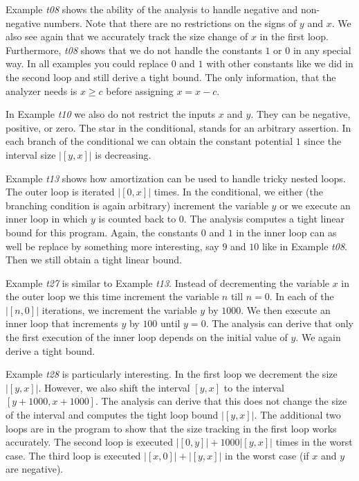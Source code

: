 \documentclass{sigplanconf}
\begin{document}
{Example \emph{t08} shows the ability of the analysis to handle
negative and non-negative numbers.  Note that there are no
restrictions on the signs of $y$ and $x$.  We also see again that we
accurately track the size change of $x$ in the first loop.
Furthermore, \emph{t08} shows that we do not handle the constants $1$
or $0$ in any special way.  In all examples you could replace $0$ and
$1$ with other constants like we did in the second loop and still
derive a tight bound.  The only information, that the analyzer needs
is $x \geq c$ before assigning $x = x - c$.

In Example \emph{t10} we also do not restrict the inputs $x$ and $y$.
They can be negative, positive, or zero.  The star {\tt *} in the
conditional, stands for an arbitrary assertion.  In each branch of the
conditional we can obtain the constant potential $1$ since the interval
size $|[y,x]|$ is decreasing.

Example \emph{t13} shows how amortization can be used to handle tricky
nested loops.  The outer loop is iterated $|[0,x]|$ times.  In the
conditional, we either (the branching condition is again arbitrary)
increment the variable $y$ or we execute an inner loop in which $y$ is
counted back to $0$.  The analysis computes a tight linear bound for
this program.  Again, the constants $0$ and $1$ in the inner loop can
as well be replace by something more interesting, say $9$ and $10$
like in Example \emph{t08}.  Then we still obtain a tight linear
bound.

Example \emph{t27} is similar to Example \emph{t13}.  Instead of
decrementing the variable $x$ in the outer loop we this time increment
the variable $n$ till $n = 0$.  In each of the $|[n,0]|$ iterations,
we increment the variable $y$ by $1000$.  We then execute an inner
loop that increments $y$ by $100$ until $y=0$.  The analysis can
derive that only the first execution of the inner loop depends on the
initial value of $y$.  We again derive a tight bound.

Example \emph{t28} is particularly interesting.  In the first loop we
decrement the size $|[y,x]|$.  However, we also shift the interval
$[y,x]$ to the interval $[y+1000,x+1000]$.  The analysis can derive
that this does not change the size of the interval and computes the
tight loop bound $|[y,x]|$.  The additional two loops are in the
program to show that the size tracking in the first loop works
accurately.  The second loop is executed $|[0,y]| + 1000|[y,x]|$ times
in the worst case.  The third loop is executed $|[x,0]| + |[y,x]|$ in
the worst case (if $x$ and $y$ are negative).

}
\end{document}

